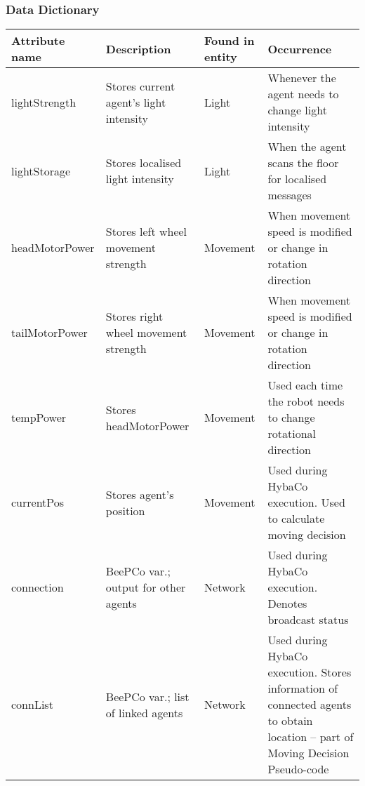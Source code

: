 \begin{landscape}
\subsubsection{Data Dictionary}
\begin{tabular}{| p{5cm} | p{4cm} | p{3cm} | p{6cm} |}
  \hline
  Attribute name & Description & Found in entity & Occurrence\\
  \hline
  lightStrength  & Stores current agent's light intensity & Light    &
    Whenever the agent needs to change light intensity              \\
  \hline
  lightStorage   & Stores localised light intensity       & Light    &
    When the agent scans the floor for localised messages           \\
  \hline
  headMotorPower & Stores left wheel movement strength    & Movement &
    When movement speed is modified or change in rotation direction \\
  \hline
  tailMotorPower & Stores right wheel movement strength   & Movement &
    When movement speed is modified or change in rotation direction \\
  \hline
  tempPower      & Stores headMotorPower                  & Movement &
    Used each time the robot needs to change rotational direction   \\
  \hline
  currentPos     & Stores agent's position                & Movement &
    Used during HybaCo execution.  Used to calculate moving decision\\
  \hline
  connection     & BeePCo var.; output for other agents   & Network  &
    Used during HybaCo execution.   Denotes broadcast status        \\
  \hline
  connList       & BeePCo var.; list of linked agents     & Network  &
    Used during HybaCo execution.  Stores information of connected
    agents to obtain location -- part of Moving Decision Pseudo-code\\
  \hline  
\end{tabular}
\end{landscape}



